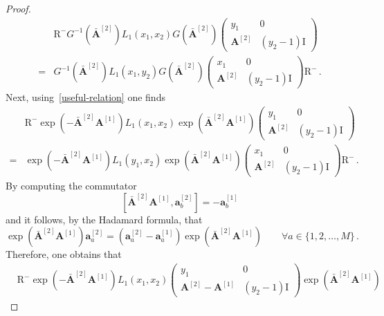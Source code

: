 \documentclass[10pt,a4paper]{amsart}
\newcommand{\ID}{\mathrm{I}}
\newcommand{\M}{M}
\newcommand{\OA}{\mathbf{A}}
\newcommand{\OAD}{\mathbf{\bar{A}}}
\newcommand{\abrOSCR}{\mathrm{R}}
\begin{document}
\begin{proof}
\begin{equation}
\begin{split}
		&\abrOSCR^{-}G^{-1}(\OAD^{[2]})L_{1}(x_{1},x_{2})G(\OAD^{[2]})\left(\begin{array}{cc}
			y_{1}&0\\
			\OA^{[2]}&(y_{2}-1)\ID
		\end{array}\right)
		\\=&
		G^{-1}(\OAD^{[2]})L_{1}(x_{1},y_{2})G(\OAD^{[2]})\left(\begin{array}{cc}
			x_1&0\\
			\OA^{[2]}&(y_{2}-1)\ID
		\end{array}\right)\abrOSCR^{-}\,.
	\end{split}
\end{equation}
Next, using~\eqref{useful-relation} one finds
\begin{equation}
	\begin{split}
		&\abrOSCR^{-}\exp{\left(-\OAD^{[2]}\OA^{[1]}\right)}L_{1}(x_{1},x_{2})\exp{\left(\OAD^{[2]}\OA^{[1]}\right)}\left(\begin{array}{cc}
			y_{1}&0\\
			\OA^{[2]}&(y_{2}-1)\ID
		\end{array}\right)
		\\=&
		\exp{\left(-\OAD^{[2]} \OA^{[1]}\right)}L_{1}(y_{1},x_{2})\exp{\left(\OAD^{[2]}\OA^{[1]}\right)}\left(\begin{array}{cc}
			x_1&0\\
			\OA^{[2]}&(y_{2}-1)\ID
		\end{array}\right)\abrOSCR^{-}\,.
	\end{split}
\end{equation}
By computing the commutator
\begin{equation}
	\left[\OAD^{[2]}\OA^{[1]},\mathbf{a}_{b}^{[2]}\right]=-\mathbf{a}_{b}^{[1]}
\end{equation}
 and it follows, by the Hadamard formula,
 that
\begin{equation}
	\exp{\left(\OAD^{[2]}\OA^{[1]}\right)}\mathbf{a}_{a}^{[2]}=\left(\mathbf{a}_{a}^{[2]}-\mathbf{a}_{a}^{[1]}\right)	\exp{\left(\OAD^{[2]}\OA^{[1]}\right)} \qquad \forall a\in \{1,2,\ldots,\M\}\,.
\end{equation}
Therefore, one obtains that
\begin{equation}
	\begin{split}
		&\abrOSCR^{-}\exp{\left(-\OAD^{[2]}\OA^{[1]}\right)}L_{1}(x_{1},x_{2})\left(\begin{array}{cc}
			y_1&0\\
			\OA^{[2]}-\OA^{[1]}&(y_{2}-1)\ID
		\end{array}\right)\exp{\left(\OAD^{[2]}\OA^{[1]}\right)}

\end{split}
\end{equation}
\end{proof}
\end{document}
